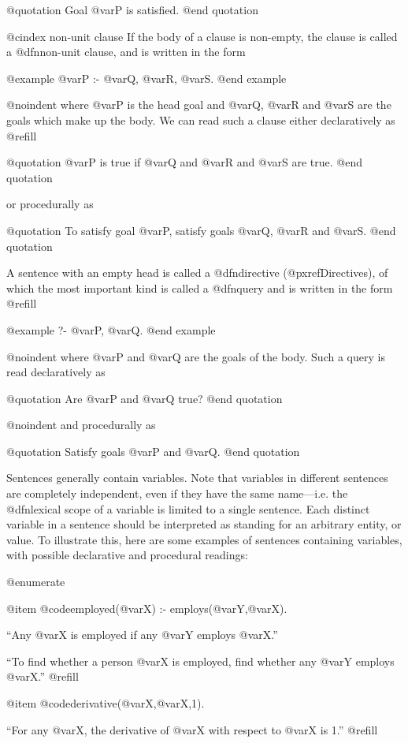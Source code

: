 {@quotation
Goal @var{P} is satisfied.
@end quotation

@cindex non-unit clause
If the body of a clause is non-empty, the clause is called a
@dfn{non-unit clause}, and is written in the form

@example
@var{P} :- @var{Q}, @var{R}, @var{S}.
@end example

@noindent
where @var{P} is the head goal and @var{Q}, @var{R} and @var{S} are the
goals which make up the body.  We can read such a clause either
declaratively as @refill

@quotation
@var{P} is true if @var{Q} and @var{R} and @var{S} are true.
@end quotation

or procedurally as

@quotation
To satisfy goal @var{P}, satisfy goals @var{Q}, @var{R} and @var{S}.
@end quotation

A sentence with an empty head is called a @dfn{directive}
(@pxref{Directives}), of which the most important kind is called a
@dfn{query} and is written in the form @refill

@example
?- @var{P}, @var{Q}.
@end example

@noindent
where @var{P} and @var{Q} are the goals of the body.  Such a query is
read declaratively as

@quotation
Are @var{P} and @var{Q} true?
@end quotation

@noindent
and procedurally as

@quotation
Satisfy goals @var{P} and @var{Q}.
@end quotation

Sentences generally contain variables.  Note that variables in different
sentences are completely independent, even if they have the same
name---i.e. the @dfn{lexical scope} of a variable is limited to a
single sentence.  Each distinct variable in a sentence should be
interpreted as standing for an arbitrary entity, or value.  To
illustrate this, here are some examples of sentences containing
variables, with possible declarative and procedural readings:

@enumerate

@item
@code{employed(@var{X}) :- employs(@var{Y},@var{X}).}

``Any @var{X} is employed if any @var{Y} employs @var{X}.''

``To find whether a person @var{X} is employed,
find whether any @var{Y} employs @var{X}.'' @refill

@item
@code{derivative(@var{X},@var{X},1).}

``For any @var{X}, the derivative of @var{X} with respect to @var{X}
is 1.'' @refill

}
